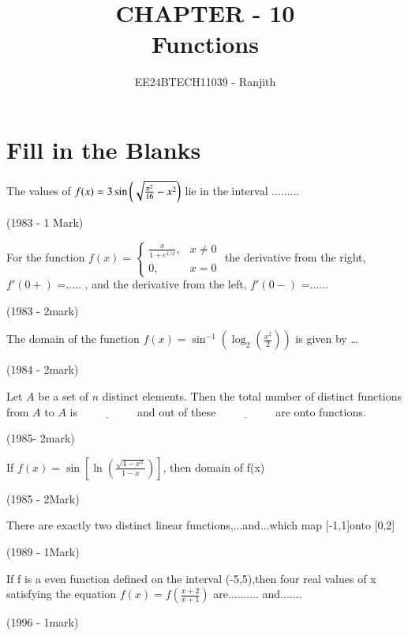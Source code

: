 \documentclass[journal,12pt,twocolumn]{IEEEtran}
\theoremstyle{remark}
\begin{document}

\vspace{3cm}

\title{CHAPTER - 10\\Functions}
\author{EE24BTECH11039 - Ranjith}
\maketitle
\newpage
\bigskip

\renewcommand{\thefigure}{\theenumi}
\renewcommand{\thetable}{\theenumi}


\section{ Fill in the Blanks}


\begin{enumerate}
\item The values of $f(x)=3\sin\left(\sqrt{\frac{\pi^2}{16}-x^2}\right) $ lie in the interval .........


\hfill{(1983 - 1 Mark)}


 \item For the function $f(x) = \begin{cases} \frac{x}{1 + e^{1/x}}, & x \neq 0 \\ 0, & x = 0 \end{cases} $
the derivative from the right, $f'(0+)$ =..... , and the derivative from the left, $f'(0-)$ =......


 
\hfill{(1983 - 2mark)}

\item{The domain of the function $f(x) =\sin^{-1}\left(\log_{2}\left(\frac{x^{2}}{2}\right)\right)$ is given by \ldots \


\hfill 
{(1984 - 2mark)}

\item Let \( A \) be a set of \( n \) distinct elements. Then the total number of distinct functions from \( A \) to \( A \) is \( \underline{\hspace{2cm}} \) and out of these \( \underline{\hspace{2cm}} \) are onto functions.

\hfill
{(1985- 2mark)}


\item If $f(x) = \sin \left[ \ln \left( \frac{\sqrt{4 - x^{2}}}{1 - x} \right) \right]$, { then domain of } f(x)  \\ 


\hfill
{(1985 - 2Mark)}

 
\item There are exactly two distinct linear functions,...and...which map [-1,1]onto [0,2]

\hfill
{(1989 - 1Mark)}



 \item If f is a even function defined on the 
interval (-5,5),then four real values of x 
satisfying the equation $f(x)=f({\frac{x+2}{x+1}})$
are.......... and.......


\hfill{(1996 - 1mark)}
}
\end{enumerate}
\end{document}
